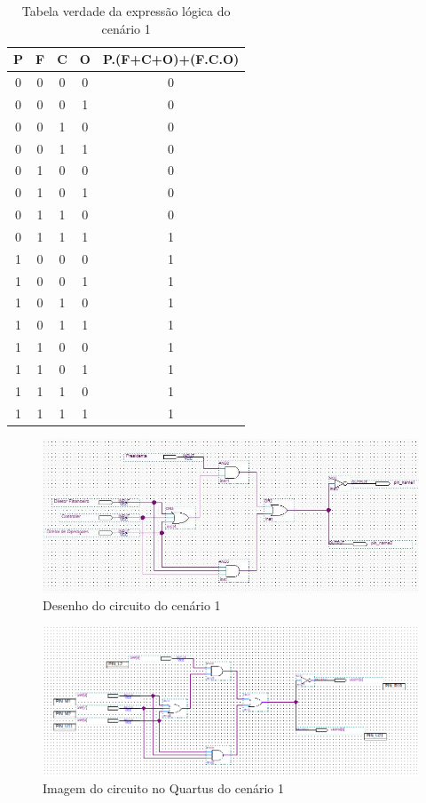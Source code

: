 	\begin{table}[h]
		\centering
		\caption{Tabela verdade da expressão lógica do cenário 1}\label{table:tabelaVerdade1}
		\begin{tabular}{c|c|c|c|c}
			\textbf{P} & \textbf{F} & \textbf{C} & \textbf{O} & \textbf{P.(F+C+O)+(F.C.O)} \\
			\hline
			0 & 0 & 0 & 0 & 0\\\hline
			0 & 0 & 0 & 1 & 0\\\hline
			0 & 0 & 1 & 0 & 0\\\hline
			0 & 0 & 1 & 1 & 0\\\hline
			0 & 1 & 0 & 0 & 0\\\hline
			0 & 1 & 0 & 1 & 0\\\hline
			0 & 1 & 1 & 0 & 0\\\hline
			0 & 1 & 1 & 1 & 1\\\hline
			1 & 0 & 0 & 0 & 1\\\hline
			1 & 0 & 0 & 1 & 1\\\hline
			1 & 0 & 1 & 0 & 1\\\hline
			1 & 0 & 1 & 1 & 1\\\hline
			1 & 1 & 0 & 0 & 1\\\hline
			1 & 1 & 0 & 1 & 1\\\hline
			1 & 1 & 1 & 0 & 1\\\hline
			1 & 1 & 1 & 1 & 1\\\hline

		\end{tabular}
	\end{table}

	\begin{figure}[H]
		\centering
		\caption{\label{fig:desenhoCircuito1}Desenho do circuito do cenário 1}
		\includegraphics[width=1\textwidth]{img/cenario1/desenhoCircuito}
	\end{figure}

	\begin{figure}[H]
		\centering
		\caption{\label{fig:printCircuito1}Imagem do circuito no Quartus do cenário 1}
		\includegraphics[width=1\textwidth]{img/cenario1/printCircuito}
	\end{figure}

